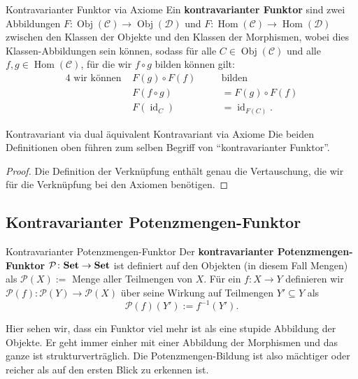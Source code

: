 \documentclass[a4paper]{amsart}
\theoremstyle{definition}
\DeclareMathOperator{\id}{id}
\DeclareMathOperator{\Hom}{Hom}
\DeclareMathOperator{\Obj}{Obj}
\newcommand{\CC}{\ensuremath{\mathcal{ C }}}
\newcommand{\DD}{\ensuremath{\mathcal{ D }}}
\newcommand{\PP}{\ensuremath{\mathcal{ P }}}
\newcommand{\Set}{\text{\textbf{Set}}}
\begin{document}
\begin{Definition}{Kontravarianter Funktor via Axiome}
   Ein \textbf{kontravarianter Funktor} sind zwei Abbildungen $F \colon \Obj( \CC ) \to \Obj( \DD )$ und $F \colon \Hom( \CC ) \to \Hom( \DD )$ zwischen den Klassen der Objekte und den Klassen der Morphismen, wobei dies Klassen-Abbildungen sein können, sodass für alle $C \in \Obj(\CC)$ und alle $f, g \in \Hom( \CC )$, für die wir $f \circ g$ bilden können gilt:
   \begin{alignat}{4}
      \text{ wir können } &F(g) \circ F(f) \quad &&\text{bilden}\\
      &F( f \circ g ) &&= F(g) \circ F(f)\\
      &F( \id_C) &&= \id_{F(C)}.
   \end{alignat} 
\end{Definition}
   
\begin{Satz}{Kontravariant via dual äquivalent Kontravariant via Axiome}
   Die beiden Definitionen oben führen zum selben Begriff von "`kontravarianter Funktor"'.
\end{Satz}
\begin{proof}
   Die Definition der Verknüpfung enthält genau die Vertauschung, die wir für die Verknüpfung bei den Axiomen benötigen.
\end{proof}

\subsection{Kontravarianter Potenzmengen-Funktor}
\begin{Definition}{Kontravarianter Potenzmengen-Funktor}
   Der \textbf{kontravarianter Potenzmengen-Funktor} $\PP \colon \Set \to \Set$ ist definiert auf den Objekten (in diesem Fall Mengen) als $\PP( X ) := $ Menge aller Teilmengen von $X$. Für ein $f \colon X \to Y$ definieren wir $\PP(f) \colon \PP(Y) \to \PP(X)$ über seine Wirkung auf Teilmengen $Y' \subseteq Y$ als
   \begin{equation}
      \PP(f)(Y') := f^{-1}(Y').
   \end{equation}
\end{Definition}   
Hier sehen wir, dass ein Funktor viel mehr ist als eine stupide Abbildung der Objekte. Er geht immer einher mit einer Abbildung der Morphismen und das ganze ist strukturverträglich. Die Potenzmengen-Bildung ist also mächtiger oder reicher als auf den ersten Blick zu erkennen ist.
\end{document}
